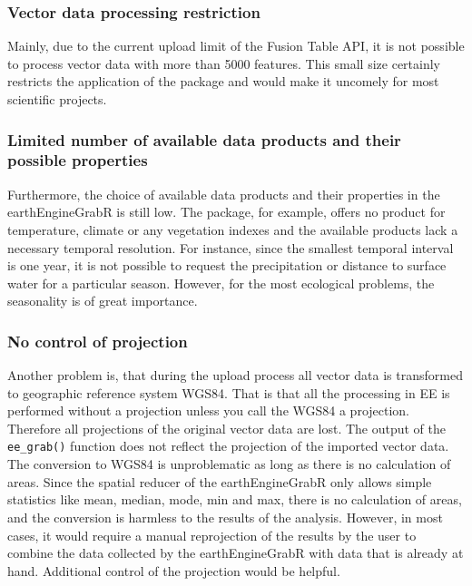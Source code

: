 \subsubsection{Vector data processing restriction}

Mainly, due to the current upload limit of the Fusion Table API, it is not possible to process vector data with more than 5000 features. This small size certainly restricts the application of the package and would make it uncomely for most scientific projects. 

\subsubsection{Limited number of available data products and their possible properties}

Furthermore, the choice of available data products and their properties in the earthEngineGrabR is still low. The package, for example, offers no product for temperature, climate or any vegetation indexes and the available products lack a necessary temporal resolution. For instance, since the smallest temporal interval is one year, it is not possible to request the precipitation or distance to surface water for a particular season. However, for the most ecological problems, the seasonality is of great importance.

\subsubsection{No control of projection}

Another problem is, that during the upload process all vector data is transformed to geographic reference system WGS84. That is that all the processing in EE is performed without a projection unless you call the WGS84 a projection. Therefore all projections of the original vector data are lost. The output of the \texttt{ee\_grab()} function does not reflect the projection of the imported vector data. The conversion to WGS84 is unproblematic as long as there is no calculation of areas. Since the spatial reducer of the earthEngineGrabR only allows simple statistics like mean, median, mode, min and max, there is no calculation of areas, and the conversion is harmless to the results of the analysis. However, in most cases, it would require a manual reprojection of the results by the user to combine the data collected by the earthEngineGrabR with data that is already at hand. Additional control of the projection would be helpful.

